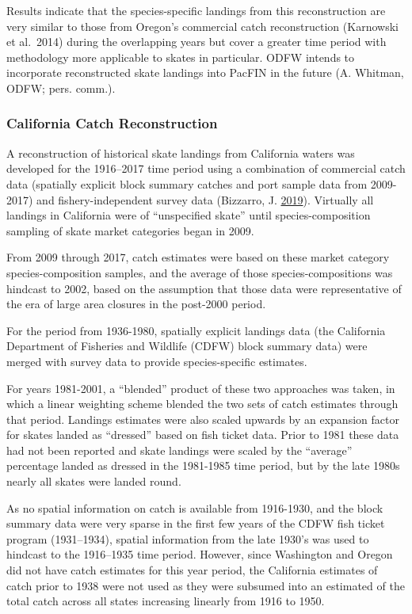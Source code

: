\documentclass[12pt,]{article}
\begin{document}
Results indicate that the species-specific landings from this
reconstruction are very similar to those from Oregon's commercial catch
reconstruction (Karnowski et al.~2014) during the overlapping years but
cover a greater time period with methodology more applicable to skates
in particular. ODFW intends to incorporate reconstructed skate landings
into PacFIN in the future (A. Whitman, ODFW; pers. comm.).

\hypertarget{california-catch-reconstruction}{%
\subsubsection{California Catch
Reconstruction}\label{california-catch-reconstruction}}

A reconstruction of historical skate landings from California waters was
developed for the 1916--2017 time period using a combination of
commercial catch data (spatially explicit block summary catches and port
sample data from 2009-2017) and fishery-independent survey data
(Bizzarro, J. \protect\hyperlink{ref-Bizzarro2019}{2019}). Virtually all
landings in California were of ``unspecified skate'' until
species-composition sampling of skate market categories began in 2009.

From 2009 through 2017, catch estimates were based on these market
category species-composition samples, and the average of those
species-compositions was hindcast to 2002, based on the assumption that
those data were representative of the era of large area closures in the
post-2000 period.

For the period from 1936-1980, spatially explicit landings data (the
California Department of Fisheries and Wildlife (CDFW) block summary
data) were merged with survey data to provide species-specific
estimates.

For years 1981-2001, a ``blended'' product of these two approaches was
taken, in which a linear weighting scheme blended the two sets of catch
estimates through that period. Landings estimates were also scaled
upwards by an expansion factor for skates landed as ``dressed'' based on
fish ticket data. Prior to 1981 these data had not been reported and
skate landings were scaled by the ``average'' percentage landed as
dressed in the 1981-1985 time period, but by the late 1980s nearly all
skates were landed round.

As no spatial information on catch is available from 1916-1930, and the
block summary data were very sparse in the first few years of the CDFW
fish ticket program (1931--1934), spatial information from the late
1930's was used to hindcast to the 1916--1935 time period. However,
since Washington and Oregon did not have catch estimates for this year
period, the California estimates of catch prior to 1938 were not used as
they were subsumed into an estimated of the total catch across all
states increasing linearly from 1916 to 1950.
\end{document}
